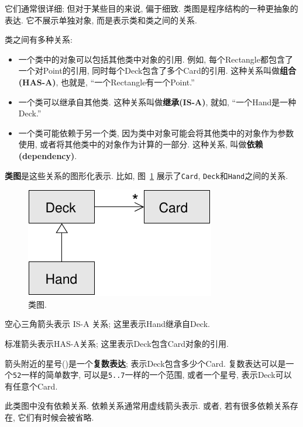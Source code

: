 \documentclass[10pt]{book}
\begin{document}
它们通常很详细; 但对于某些目的来说, 偏于细致. 
类图是程序结构的一种更抽象的表达. 
它不展示单独对象, 而是表示类和类之间的关系. 

类之间有多种关系:

\begin{itemize}

\item 一个类中的对象可以包括其他类中对象的引用. 
例如, 每个Rectangle都包含了一个对Point的引用,
同时每个Deck包含了多个Card的引用. 
这种关系叫做{\bf 组合(HAS-A)}, 也就是, ``一个Rectangle有一个Point.''

\item 一个类可以继承自其他类. 
这种关系叫做{\bf 继承(IS-A)}, 就如, ``一个Hand是一种Deck.''

\item 一个类可能依赖于另一个类, 因为类中对象可能会将其他类中的对象作为参数
使用, 或者将其他类中的对象作为计算的一部分. 
这种关系, 叫做{\bf 依赖(dependency)}.

\end{itemize}

{\bf 类图}是这些关系的图形化表示. 比如, 图~\ref{fig.class1} 
展示了{\tt Card}, {\tt Deck}和{\tt Hand}之间的关系. 

\begin{figure}
\centerline
{\includegraphics[scale=0.8]{figs/class1.pdf}}
\caption{类图.}
\label{fig.class1}
\end{figure}

空心三角箭头表示 IS-A 关系;
这里表示Hand继承自Deck. 

标准箭头表示HAS-A关系;
这里表示Deck包含Card对象的引用. 

箭头附近的星号({\tt *})是一个{\bf 复数表达};
表示Deck包含多少个Card. 
复数表达可以是一个{\tt 52}一样的简单数字, 
可以是{\tt 5..7}一样的一个范围, 
或者一个星号, 表示Deck可以有任意个Card. 

此类图中没有依赖关系. 
依赖关系通常用虚线箭头表示. 
或者, 若有很多依赖关系存在, 它们有时候会被省略. 
\end{document}
